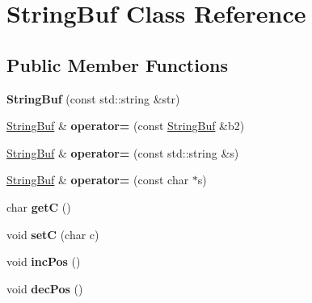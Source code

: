 \hypertarget{class_string_buf}{
\section{StringBuf Class Reference}
\label{class_string_buf}
}
\subsection*{Public Member Functions}
\begin{DoxyCompactItemize}
\item 
\hypertarget{class_string_buf_ab44a713bcbf5fa18a5ce5290efbc9ea4}{
{\bfseries StringBuf} (const std::string \&str)}
\label{class_string_buf_ab44a713bcbf5fa18a5ce5290efbc9ea4}

\item 
\hypertarget{class_string_buf_a6792f21917f4c60fabb426867e0fce8d}{
\hyperlink{class_string_buf}{StringBuf} \& {\bfseries operator=} (const \hyperlink{class_string_buf}{StringBuf} \&b2)}
\label{class_string_buf_a6792f21917f4c60fabb426867e0fce8d}

\item 
\hypertarget{class_string_buf_af374c680fb6d2098db1bf4f405947074}{
\hyperlink{class_string_buf}{StringBuf} \& {\bfseries operator=} (const std::string \&s)}
\label{class_string_buf_af374c680fb6d2098db1bf4f405947074}

\item 
\hypertarget{class_string_buf_a6f06178486fce5524e999e0cb184fa0f}{
\hyperlink{class_string_buf}{StringBuf} \& {\bfseries operator=} (const char $\ast$s)}
\label{class_string_buf_a6f06178486fce5524e999e0cb184fa0f}

\item 
\hypertarget{class_string_buf_a2abd2a897973ed93bcde7f1b47bbb2f1}{
char {\bfseries getC} ()}
\label{class_string_buf_a2abd2a897973ed93bcde7f1b47bbb2f1}

\item 
\hypertarget{class_string_buf_ad535b015fda00740cd6e9111aaf0ef8c}{
void {\bfseries setC} (char c)}
\label{class_string_buf_ad535b015fda00740cd6e9111aaf0ef8c}

\item 
\hypertarget{class_string_buf_a84a6d386dfada8eb501c9ca9bf08cbd4}{
void {\bfseries incPos} ()}
\label{class_string_buf_a84a6d386dfada8eb501c9ca9bf08cbd4}

\item 
\hypertarget{class_string_buf_a792999978f4a946375bfd850aa248481}{
void {\bfseries decPos} ()}
\label{class_string_buf_a792999978f4a946375bfd850aa248481}


\end{DoxyCompactItemize}
